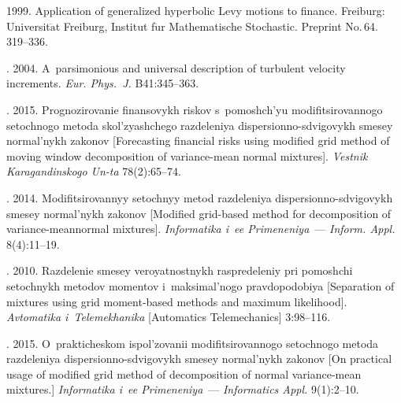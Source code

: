 \begin{multicols}{2}
{{\begin{thebibliography}{99}
 1999. Application of generalized hyperbolic Levy
motions to finance. 
{Freiburg: Universit$\ddot{\mbox{a}}$t Freiburg, Institut f$\ddot{\mbox{u}}$r 
Mathematische Stochastic}. Preprint No.\,64. 319--336.

. 2004.
A~parsimonious and universal description of turbulent velocity increments. 
\textit{Eur. Phys.~J.} B41:345--363.

. 2015. 
Prognozirovanie finansovykh riskov s~pomoshch'yu mo\-di\-fi\-tsi\-ro\-van\-no\-go setochnogo 
metoda skol'zyashchego razdeleniya dispersionno-sdvigovykh smesey normal'nykh zakonov 
[Forecasting financial risks using modified grid method of moving window decomposition 
of variance-mean normal mixtures]. 
\textit{Vestnik Karagandinskogo Un-ta} 78(2):65--74.

. 2014. Modi\-fi\-tsi\-ro\-van\-nyy 
setochnyy metod razdeleniya dispersionno-sdvigovykh smesey normal'nykh zakonov 
[Modified grid-based method for decomposition of variance-mean\linebreak normal mixtures]. 
\textit{Informatika i~ee Primeneniya}~---
\textit{Inform. Appl.} 8(4):11--19.

. 2010.
{Razdelenie smesey veroyatnostnykh raspredeleniy pri pomoshchi setochnykh 
metodov momentov i~maksimal'nogo pravdopodobiya} [Separation of mixtures using 
grid moment-based methods and maximum likelihood].
\textit{Avtomatika i~Telemekhanika} [Automatics Telemechanics] 3:98--116.

. 2015.
O~prak\-ti\-che\-skom ispol'zovanii modifitsirovannogo setochnogo metoda razdeleniya 
dispersionno-sdvigovykh smesey normal'nykh zakonov [On practical usage of modified 
grid method of decomposition of normal variance-mean mixtures.] 
\textit{Informatika i~ee Primeneniya}~--- \textit{Informatics Appl.} 9(1):2--10.
\end{thebibliography}

 }
 }

\end{multicols}

\vspace*{-3pt}

